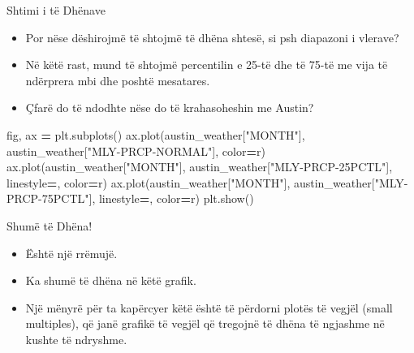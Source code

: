 \documentclass[
  ignorenonframetext,
]{beamer}
\newenvironment{Shaded}{\begin{snugshade}}{\end{snugshade}}
\newcommand{\NormalTok}[1]{#1}
\newcommand{\OperatorTok}[1]{\textcolor[rgb]{0.81,0.36,0.00}{\textbf{#1}}}
\newcommand{\StringTok}[1]{\textcolor[rgb]{0.31,0.60,0.02}{#1}}
\begin{document}
\begin{frame}[fragile]{Shtimi i të Dhënave}
\protect\hypertarget{shtimi-i-tuxeb-dhuxebnave-1}{}
\begin{itemize}
\item
  Por nëse dëshirojmë të shtojmë të dhëna shtesë, si psh diapazoni i
  vlerave?
\item
  Në këtë rast, mund të shtojmë percentilin e 25-të dhe të 75-të me vija
  të ndërprera mbi dhe poshtë mesatares.
\item
  Çfarë do të ndodhte nëse do të krahasoheshin me Austin?
\end{itemize}


\begin{Shaded}
\begin{Highlighting}[]
\NormalTok{fig, ax }\OperatorTok{=}\NormalTok{ plt.subplots()}
\NormalTok{ax.plot(austin\_weather[}\StringTok{"MONTH"}\NormalTok{], austin\_weather[}\StringTok{"MLY{-}PRCP{-}NORMAL"}\NormalTok{],        color}\OperatorTok{=}\StringTok{\textquotesingle{}r\textquotesingle{}}\NormalTok{)}
\NormalTok{ax.plot(austin\_weather[}\StringTok{"MONTH"}\NormalTok{], austin\_weather[}\StringTok{"MLY{-}PRCP{-}25PCTL"}\NormalTok{],         linestyle}\OperatorTok{=}\StringTok{\textquotesingle{}{-}{-}\textquotesingle{}}\NormalTok{, color}\OperatorTok{=}\StringTok{\textquotesingle{}r\textquotesingle{}}\NormalTok{)}
\NormalTok{ax.plot(austin\_weather[}\StringTok{"MONTH"}\NormalTok{], austin\_weather[}\StringTok{"MLY{-}PRCP{-}75PCTL"}\NormalTok{],         linestyle}\OperatorTok{=}\StringTok{\textquotesingle{}{-}{-}\textquotesingle{}}\NormalTok{, color}\OperatorTok{=}\StringTok{\textquotesingle{}r\textquotesingle{}}\NormalTok{)}
\NormalTok{plt.show()}
\end{Highlighting}
\end{Shaded}
\end{frame}

\begin{frame}{Shumë të Dhëna!}
\protect\hypertarget{shumuxeb-tuxeb-dhuxebna}{}
\begin{itemize}
\item
  Është një rrëmujë.
\item
  Ka shumë të dhëna në këtë grafik.
\item
  Një mënyrë për ta kapërcyer këtë është të përdorni plotës të vegjël
  (small multiples), që janë grafikë të vegjël që tregojnë të dhëna të
  ngjashme në kushte të ndryshme.
\end{itemize}
\end{frame}
\end{document}
